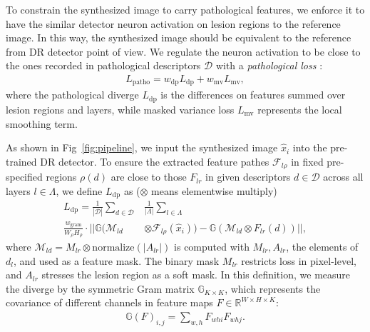 \documentclass[letterpaper]{article} %
\begin{document}
   To constrain the synthesized image to carry pathological features, we enforce it to have the similar detector neuron activation on lesion regions to the reference image. In this way, the synthesized image should be equivalent to the reference from DR detector point of view. We regulate the neuron activation to be close to the ones recorded in pathological descriptors $ \mathcal{D} $ with a  \emph{pathological loss} :
    \begin{align}
	\label{align_patho_loss}
	L_\mathrm{patho} = w_\mathrm{dp} L_\mathrm{dp} + w_\mathrm{mv} L_\mathrm{mv},
	\end{align}
	where the pathological diverge $L_\mathrm{dp}$ is the differences on features summed over lesion regions and layers, while masked variance loss $L_\mathrm{mv}$ represents the local smoothing term.

    As shown in  Fig~\ref{fig:pipeline}, we input the synthesized image $ \hat x_i $ into the pre-trained DR detector.
    To ensure the extracted feature pathes $ \mathcal{F}_{l\rho} $ in fixed pre-specified regions $ \rho(d) $ are close to those $ F_{lr} $ in given descriptors $ d \in \mathcal{D} $ across all layers $ l \in \Lambda $, we define $ L_\mathrm{dp}$ as ($ \otimes $ means elementwise multiply)
    \begin{align}
    \label{align_dp_loss} \textstyle
    L_\mathrm{dp} = \frac{1}{|\mathcal{D}|} \sum_{d\in \mathcal{D}} &\textstyle \frac{1}{|\Lambda|} \sum_{l \in \Lambda}\nonumber \\ \textstyle \frac{w_\mathrm{gram}}{W_\rho H_\rho} \cdot
    || \mathbb{G}(\mathcal{M}_{ld}& \otimes  \mathcal{F}_{l\rho}(\hat x_i))
    - \mathbb{G}(\mathcal{M}_{ld} \otimes F_{lr}(d)) ||,
    \end{align}
	where $ \mathcal{M}_{ld} = M_{lr} \otimes \mathrm{normalize}(|A_{lr}|) $ is computed with $ M_{lr}, A_{lr}$, the elements of $ d_l $, and used as a feature mask. The binary mask $ M_{lr} $ restricts loss in pixel-level, and $ A_{lr} $ stresses the lesion region as a soft mask.
	In this definition, we measure the diverge by the symmetric Gram matrix $ \mathbb{G}_{K\times K} $, which represents the covariance of different channels in feature maps $ F \in \mathbb{R}^{W\times H\times K}$:
	\begin{align}
	\label{align_gram} \textstyle
	\mathbb{G}(F)_{i, j} = \sum_{w,h} F_{whi}F_{whj}.
	\end{align}
\end{document}
